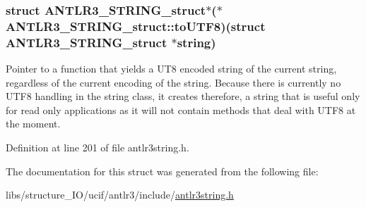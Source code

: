 \hypertarget{struct_a_n_t_l_r3___s_t_r_i_n_g__struct_a2ec377c0e2e1b07e4f5772f946d49b87}{
\subsubsection[{to\-U\-T\-F8}]{\setlength{\rightskip}{0pt plus 5cm}struct {\bf A\-N\-T\-L\-R3\-\_\-\-S\-T\-R\-I\-N\-G\-\_\-struct}$\ast$($\ast$ A\-N\-T\-L\-R3\-\_\-\-S\-T\-R\-I\-N\-G\-\_\-struct\-::to\-U\-T\-F8)(struct {\bf A\-N\-T\-L\-R3\-\_\-\-S\-T\-R\-I\-N\-G\-\_\-struct} $\ast$string)}}\label{struct_a_n_t_l_r3___s_t_r_i_n_g__struct_a2ec377c0e2e1b07e4f5772f946d49b87}
Pointer to a function that yields a U\-T8 encoded string of the current string, regardless of the current encoding of the string. Because there is currently no U\-T\-F8 handling in the string class, it creates therefore, a string that is useful only for read only applications as it will not contain methods that deal with U\-T\-F8 at the moment. 

Definition at line 201 of file antlr3string.\-h.



The documentation for this struct was generated from the following file\-:\begin{DoxyCompactItemize}
\item 
libs/structure\-\_\-\-I\-O/ucif/antlr3/include/\hyperlink{antlr3string_8h}{antlr3string.\-h}\end{DoxyCompactItemize}
